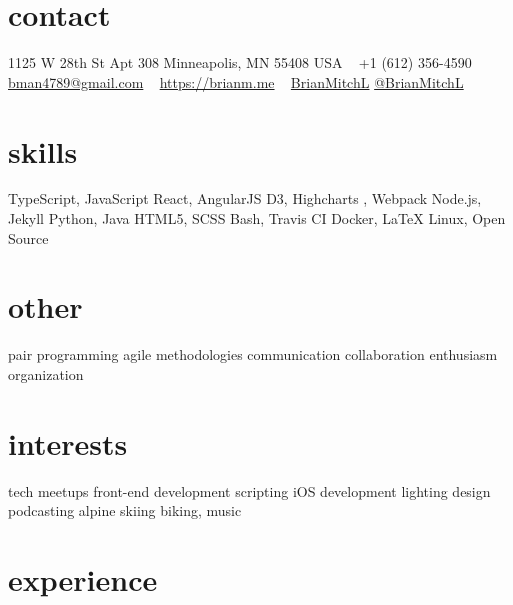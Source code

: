 \documentclass[]{cv-style} %
\begin{document}
\lastupdated


\begin{aside} %
\section{contact}
\small{1125 W 28th St
Apt 308
Minneapolis, MN 55408
USA}
~
+1 (612) 356-4590
~
\href{mailto:bman4789@gmail.com}{bman4789@gmail.com}
~
\href{https://brianm.me}{https://brianm.me}
~
\href{https://github.com/BrianMitchL}{\textcolor{darkgray}{ }BrianMitchL}
\href{https://twitter.com/BrianMitchL}{\textcolor{twitter}{ }@BrianMitchL}
\section{skills}
TypeScript, JavaScript
React, AngularJS
D3, Highcharts
, Webpack
Node.js, Jekyll
Python, Java
HTML5, SCSS
Bash, Travis CI
Docker, \LaTeX
Linux, Open Source
\section{other}
pair programming
agile methodologies
communication
collaboration
enthusiasm
organization
\section{interests}
tech meetups
front-end development
scripting
iOS development
lighting design
podcasting
alpine skiing
biking, music
\end{aside}



\section{experience}

%
%
%
%
\end{document}
